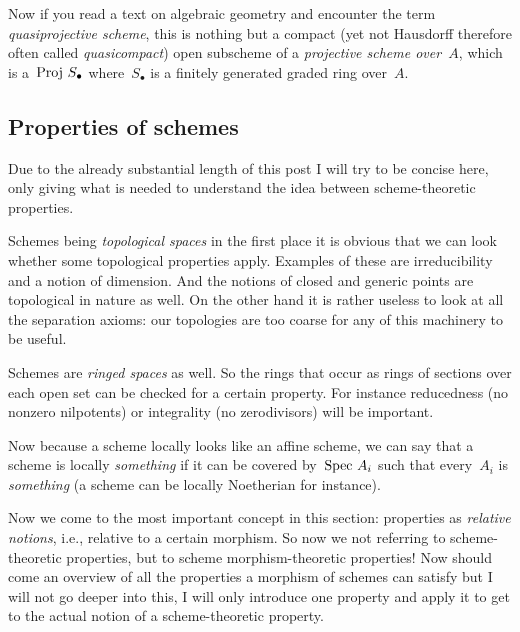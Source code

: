 \begin{remark}
  Now if you read a text on algebraic geometry and encounter the term \emph{quasiprojective scheme}, this is nothing but a compact (yet not Hausdorff therefore often called \emph{quasicompact}) open subscheme of a \emph{projective scheme over~$A$}, which is a~$\operatorname{Proj\,} S_\bullet$ where~$S_\bullet$ is a finitely generated graded ring over~$A$.
\end{remark}


\subsection{Properties of schemes}
Due to the already substantial length of this post I will try to be concise here, only giving what is needed to understand the idea between scheme-theoretic properties.

\begin{example}
  Schemes being \emph{topological spaces} in the first place it is obvious that we can look whether some topological properties apply. Examples of these are irreducibility and a notion of dimension. And the notions of closed and generic points are topological in nature as well. On the other hand it is rather useless to look at all the separation axioms: our topologies are too coarse for any of this machinery to be useful.
\end{example}

\begin{example}
  Schemes are \emph{ringed spaces} as well. So the rings that occur as rings of sections over each open set can be checked for a certain property. For instance reducedness (no nonzero nilpotents) or integrality (no zerodivisors) will be important.
\end{example}

\begin{example}
  Now because a scheme locally looks like an affine scheme, we can say that a scheme is locally \emph{something} if it can be covered by~$\operatorname{Spec\,} A_i$ such that every~$A_i$ is \emph{something} (a scheme can be locally Noetherian for instance).
\end{example}

\begin{example}
   Now we come to the most important concept in this section: properties as \emph{relative notions}, i.e., relative to a certain morphism. So now we not referring to scheme-theoretic properties, but to scheme morphism-theoretic properties! Now should come an overview of all the properties a morphism of schemes can satisfy but I will not go deeper into this, I will only introduce one property and apply it to get to the actual notion of a scheme-theoretic property. 
\end{example}

